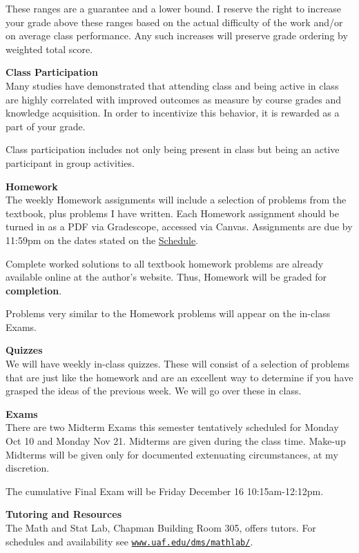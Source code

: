 \documentclass[12pt]{article}
\renewcommand{\emph}[1]{\textsf{\textbf{#1}}}
\newcommand{\localhead}[1]{\par\smallskip\textbf{#1} \smallskip\nobreak\\}%
\def\heading#1{\localhead{\large\emph{#1}}}
\begin{document}
\vspace{-3mm}
These ranges are a guarantee and a lower bound. I reserve the right to increase your grade above these ranges based on the actual difficulty of the work and/or on average class performance. Any such increases will preserve grade ordering by weighted total score. 

\heading{Class Participation}
Many studies have demonstrated that attending class and being active in class are highly correlated with improved outcomes as measure by course grades and knowledge acquisition. In order to incentivize this behavior, it is rewarded as a part of your grade. 

Class participation includes not only being present in class but being an active participant in group activities.

\heading{Homework}
The weekly Homework assignments will include a selection of problems from the textbook, plus problems I have written.  Each Homework assignment should be turned in as a PDF via Gradescope, accessed via Canvas.  Assignments are due by 11:59pm on the dates stated on the \href{https://docs.google.com/spreadsheets/d/e/2PACX-1vS6mzghqdySBSt77fxeCwG3dFzjLlvvRVqtKPjE4XMysFBkQNuvpe4MO352YQRqhwnX032A4vdcT0w-/pubhtml}{Schedule}.  

Complete worked solutions to all textbook homework problems are already available online at the author's website. Thus, Homework will be graded for \emph{completion}.  

Problems very similar to the Homework problems will appear on the in-class Exams.

\heading{Quizzes}
We will have weekly in-class quizzes. These will consist of a selection of problems that are just like the homework and are an excellent way to determine if you have grasped the ideas of the previous week. We will go over these in class.

\heading{Exams}
There are two Midterm Exams this semester tentatively scheduled for Monday Oct 10 and Monday Nov 21.  Midterms are given during the class time.  Make-up Midterms will be given only for documented extenuating circumstances, at my discretion.

The cumulative Final Exam will be Friday December 16 10:15am-12:12pm.

\heading{Tutoring and Resources}
The Math and Stat Lab, Chapman Building Room 305, offers tutors.  For schedules and availability see \href{http://www.uaf.edu/dms/mathlab/}{\texttt{www.uaf.edu/dms/mathlab/}}.
\end{document}
